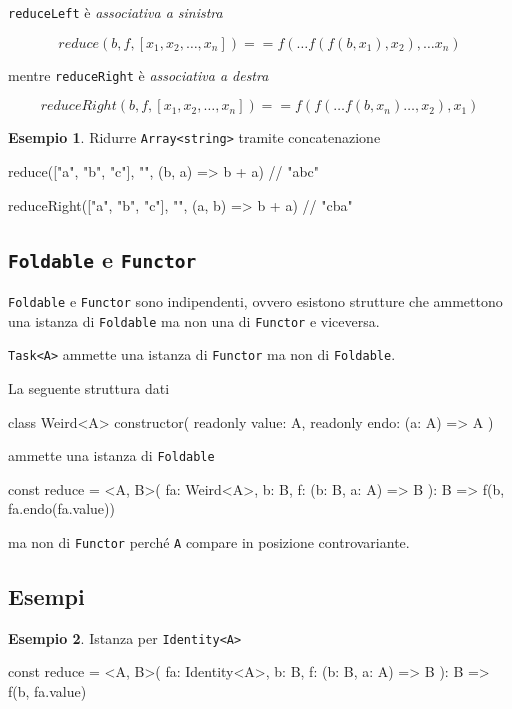 \documentclass[12pt]{article}
\theoremstyle{definition}
\newtheorem{example}{Esempio}[section]
\newenvironment{code}
  {\vspace{0.5cm} \VerbatimEnvironment\begin{typescriptcode}}
  {\end{typescriptcode} \vspace{0.2cm}}
\begin{document}
\texttt{reduceLeft} è \emph{associativa a sinistra}

$$
reduce(b, f, [x_1, x_2, \ldots , x_n])  == f( \ldots f(f(b, x_1), x_2), \ldots x_n)
$$

mentre \texttt{reduceRight} è \emph{associativa a destra}

$$
reduceRight(b, f, [x_1, x_2, \ldots , x_n])  == f(f( \ldots f(b, x_n) \ldots , x_2), x_1)
$$

\begin{example}
Ridurre \texttt{Array<string>} tramite concatenazione

\begin{code}
reduce(["a", "b", "c"], "", (b, a) => b + a) // "abc"

reduceRight(["a", "b", "c"], "", (a, b) => b + a) // "cba"
\end{code}
\end{example}

\subsection{\texttt{Foldable} e \texttt{Functor}}

\texttt{Foldable} e \texttt{Functor} sono indipendenti, ovvero esistono strutture che ammettono una istanza di \texttt{Foldable} ma non una di
\texttt{Functor} e viceversa.

\texttt{Task<A>} ammette una istanza di \texttt{Functor} ma non di \texttt{Foldable}.

La seguente struttura dati

\begin{code}
class Weird<A> {
  constructor(
    readonly value: A,
    readonly endo: (a: A) => A
  ) {}
}
\end{code}

ammette una istanza di \texttt{Foldable}

\begin{code}
const reduce = <A, B>(
  fa: Weird<A>,
  b: B,
  f: (b: B, a: A) => B
): B => f(b, fa.endo(fa.value))
\end{code}

ma non di \texttt{Functor} perché \texttt{A} compare in posizione controvariante.

\subsection{Esempi}

\begin{example}
Istanza per \texttt{Identity<A>}

\begin{code}
const reduce = <A, B>(
  fa: Identity<A>,
  b: B,
  f: (b: B, a: A) => B
): B => f(b, fa.value)
\end{code}
\end{example}
\end{document}
